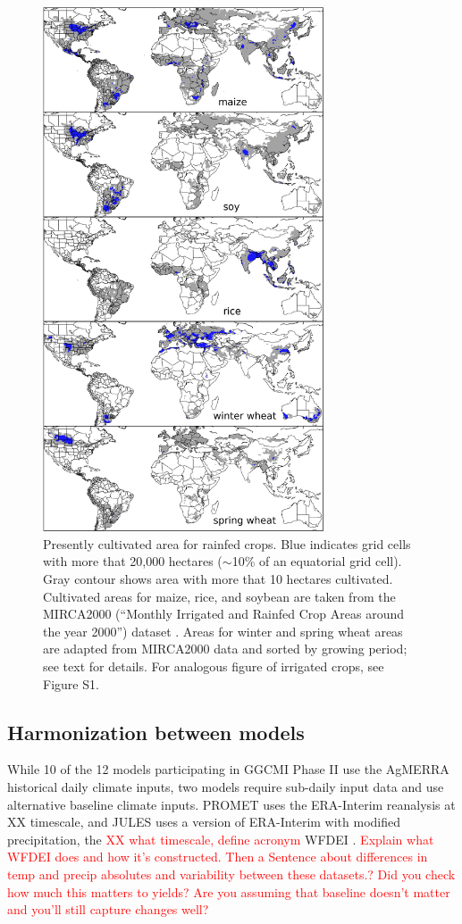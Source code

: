 \documentclass[gmd, manuscript]{copernicus} %
\begin{document}
{\begin{figure}[ht]
\centering
   \includegraphics[width=8.3cm]{figures/croparea.png}
   \caption{Presently cultivated area for rainfed crops. Blue indicates grid cells with more that 20,000 hectares ($\sim$10\% of an equatorial grid cell). 
   Gray contour shows area with more that 10 hectares cultivated. Cultivated areas for maize, rice, and soybean are taken from the MIRCA2000 (``Monthly Irrigated and Rainfed Crop Areas around the year 2000'') dataset \citep{Portmann2010}. 
   Areas for winter and spring wheat areas are adapted from MIRCA2000 data and sorted by growing period; see text for details.  For analogous figure of irrigated crops, see Figure S1.}
   \label{fig:crop_area}
\end{figure}


\subsection{Harmonization between models}

While 10 of the 12 models participating in GGCMI Phase II use the AgMERRA historical daily climate inputs, two models require sub-daily input data and use alternative baseline climate inputs. PROMET uses the ERA-Interim reanalysis \citep{dee2011era} at XX timescale, and JULES uses a version of ERA-Interim with modified precipitation, the \textcolor{red}{XX what timescale, define acronym} WFDEI \citep{weedon2014wfdei}.  \textcolor{red}{Explain what WFDEI does and how it's constructed. Then a Sentence about differences in temp and precip absolutes and variability between these datasets.? Did you check how much this matters to yields? Are you assuming that baseline doesn't matter and you'll still capture changes well?}

}
\end{document}
